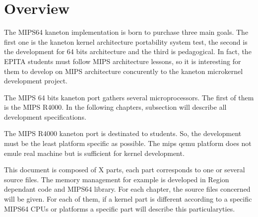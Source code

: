 %
%
%
%
%
%

%
%

\chapter{Overview}

The MIPS64 kaneton implementation is born to purchase three main goals.
The first one is the kaneton kernel architecture portability system test,
the second is the development for 64 bits architecture and the third is pedagogical.
In fact, the EPITA students must follow MIPS architecture lessons, so it is interesting 
for them to develop on MIPS architecture concurently to the kaneton microkernel development
project.

The MIPS 64 bits kaneton port gathers several microprocessors. The first of them is the MIPS R4000. In the following chapters, subsection will describe all development specifications.

The MIPS R4000 kaneton port is destinated to students. So, the development must be the least platform specific as possible.
The mips qemu platform does not emule real machine but is sufficient for kernel development.

This document is composed of X parts, each part corresponds to one or several source files. The memory management for example is developed in Region dependant code and MIPS64 library. For each chapter, the source files concerned will be given.
For each of them, if a kernel part is different according to a specific MIPS64 CPUs or platforms a specific part will describe this particularyties.
